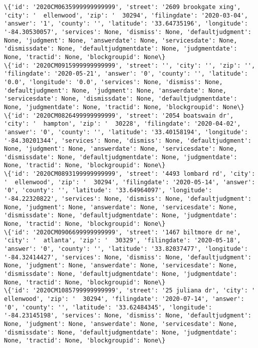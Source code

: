 \documentclass[11pt]{article}
\begin{document}
\begin{Verbatim}[commandchars=\\\{\}]
\{'id': '2020CM0635999999999999', 'street': '2609 brookgate xing', 'city': '  ellenwood', 'zip': '  30294', 'filingdate': '2020-03-04', 'answer': '1', 'county': '', 'latitude': '33.64735196', 'longitude': '-84.30530057', 'services': None, 'dismiss': None, 'defaultjudgment': None, 'judgment': None, 'answerdate': None, 'servicesdate': None, 'dismissdate': None, 'defaultjudgmentdate': None, 'judgmentdate': None, 'tractid': None, 'blockgroupid': None\}
\{'id': '2020CM0915999999999999', 'street': '', 'city': '', 'zip': '', 'filingdate': '2020-05-21', 'answer': '0', 'county': '', 'latitude': '0.0', 'longitude': '0.0', 'services': None, 'dismiss': None, 'defaultjudgment': None, 'judgment': None, 'answerdate': None, 'servicesdate': None, 'dismissdate': None, 'defaultjudgmentdate': None, 'judgmentdate': None, 'tractid': None, 'blockgroupid': None\}
\{'id': '2020CM0826499999999999', 'street': '2054 boatswain dr', 'city': '  hampton', 'zip': '  30228', 'filingdate': '2020-04-02', 'answer': '0', 'county': '', 'latitude': '33.40158194', 'longitude': '-84.30201344', 'services': None, 'dismiss': None, 'defaultjudgment': None, 'judgment': None, 'answerdate': None, 'servicesdate': None, 'dismissdate': None, 'defaultjudgmentdate': None, 'judgmentdate': None, 'tractid': None, 'blockgroupid': None\}
\{'id': '2020CM0893199999999999', 'street': '4493 lombard rd', 'city': '  ellenwood', 'zip': '  30294', 'filingdate': '2020-05-14', 'answer': '0', 'county': '', 'latitude': '33.64964097', 'longitude': '-84.22320822', 'services': None, 'dismiss': None, 'defaultjudgment': None, 'judgment': None, 'answerdate': None, 'servicesdate': None, 'dismissdate': None, 'defaultjudgmentdate': None, 'judgmentdate': None, 'tractid': None, 'blockgroupid': None\}
\{'id': '2020CM0906699999999999', 'street': '1467 biltmore dr ne', 'city': '  atlanta', 'zip': '  30329', 'filingdate': '2020-05-18', 'answer': '0', 'county': '', 'latitude': '33.82037477', 'longitude': '-84.32414427', 'services': None, 'dismiss': None, 'defaultjudgment': None, 'judgment': None, 'answerdate': None, 'servicesdate': None, 'dismissdate': None, 'defaultjudgmentdate': None, 'judgmentdate': None, 'tractid': None, 'blockgroupid': None\}
\{'id': '2020CM1085799999999999', 'street': '25 juliana dr', 'city': '  ellenwood', 'zip': '  30294', 'filingdate': '2020-07-14', 'answer': '0', 'county': '', 'latitude': '33.62484345', 'longitude': '-84.23145198', 'services': None, 'dismiss': None, 'defaultjudgment': None, 'judgment': None, 'answerdate': None, 'servicesdate': None, 'dismissdate': None, 'defaultjudgmentdate': None, 'judgmentdate': None, 'tractid': None, 'blockgroupid': None\}

\end{Verbatim}
\end{document}
